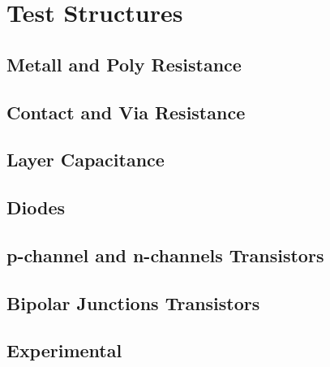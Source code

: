 \section{Test Structures}

\subsection{Metall and Poly Resistance}


\subsection{Contact and Via Resistance}

\subsection{Layer Capacitance}

\subsection{Diodes}


\subsection{p-channel and n-channels Transistors}


\subsection{Bipolar Junctions Transistors}

\subsection{Experimental}


\clearpage

